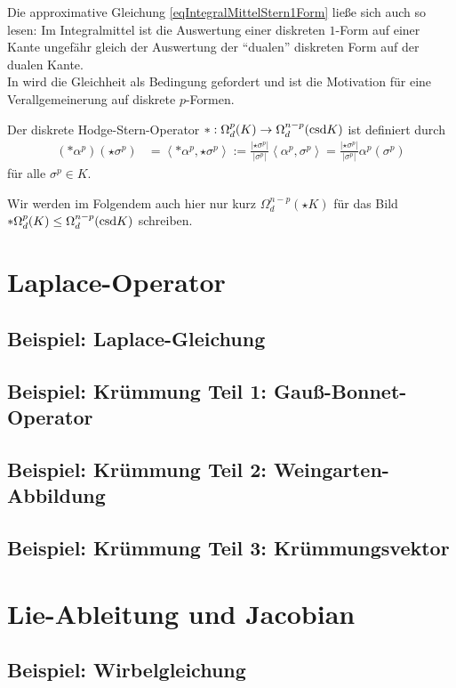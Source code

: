   Die approximative Gleichung \eqref{eqIntegralMittelStern1Form} ließe sich auch so lesen: 
  Im Integralmittel ist die Auswertung einer diskreten \( 1 \)-Form auf einer Kante ungefähr gleich der Auswertung der "`dualen"' diskreten Form auf der dualen Kante.\\
  In \cite{desbrun} wird die Gleichheit als Bedingung gefordert und ist die Motivation für eine Verallgemeinerung auf diskrete \( p \)-Formen. 

  \begin{definition}
    Der diskrete Hodge-Stern-Operator \( *:\Omega_{d}^{p}(K)\rightarrow\Omega_{d}^{n-p}(\text{csd} K) \) ist definiert durch
    \begin{align}
      (*\alpha^{p})(\star\sigma^{p}) &= \left\langle *\alpha^{p}, \star\sigma^{p} \right\rangle 
                                        := \frac{|\star\sigma^{p}|}{|\sigma^{p}|} \left\langle \alpha^{p}, \sigma^{p} \right\rangle
                                         = \frac{|\star\sigma^{p}|}{|\sigma^{p}|} \alpha^{p}(\sigma^{p})
    \end{align}
    für alle \( \sigma^{p}\in K \).
    
    Wir werden im Folgendem auch hier nur kurz \( \Omega_{d}^{n-p}(\star K)\) für das Bild \( *\Omega_{d}^{p}(K)\le \Omega_{d}^{n-p}(\text{csd} K)\) schreiben.
  \end{definition}



\section{Laplace-Operator}

  \subsection{Beispiel: Laplace-Gleichung}

  \subsection{Beispiel: Krümmung Teil 1: Gauß-Bonnet-Operator}
  \subsection{Beispiel: Krümmung Teil 2: Weingarten-Abbildung}
  \subsection{Beispiel: Krümmung Teil 3: Krümmungsvektor}


\section{Lie-Ableitung und Jacobian}

  \subsection{Beispiel: Wirbelgleichung}


